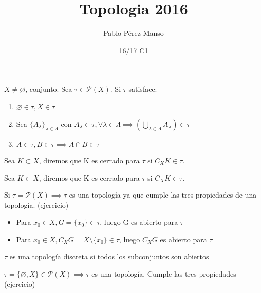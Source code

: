 \documentclass[palatino]{apuntes}
\title{Topologia 2016}
\author{Pablo Pérez Manso}
\date{16/17 C1}
\begin{document}
\pagestyle{plain}
\maketitle

\tableofcontents
\newpage

\begin{defn}[Topología]
$X \neq \varnothing$, conjunto. Sea $\tau \in \mathcal{P}(X)$. Si $\tau$ satisface:
\begin{enumerate}
\item $\varnothing \in \tau, X \in \tau$
\item Sea $\{A_\lambda\}_{\lambda \in \Lambda}$ con $ A_\lambda \in \tau, \forall \lambda \in \Lambda \implies  (\bigcup_{\lambda \in \Lambda} A_\lambda) \in \tau$
\item $A \in \tau, B \in \tau \implies A \cap B \in \tau$
\end{enumerate}
\end{defn}



\begin{defn}[Abierto]
Sea $K \subset X$, diremos que K es cerrado para $\tau$ si $C_XK\in\tau$.
\end{defn}
\begin{defn}[Cerrado]
Sea $K \subset X$, diremos que K es cerrado para $\tau$ si $C_XK\in\tau$.
\end{defn}

\begin{example}
	Si $\tau = \mathcal{P}(X) \implies \tau $ es una topología ya que cumple las tres propiedades de una topología. (ejercicio)

	\begin{itemize}
		\item Para $x_0 \in X, G=\{x_0\} \in \tau$, luego G es abierto para $\tau$
		\item Para $x_0 \in X, C_XG=X\setminus\{x_0\} \in \tau$, luego $C_XG$ es abierto para $\tau$
	\end{itemize}
\end{example}

\begin{defn}
$\tau$ es una topología discreta si todos los subconjuntos son abiertos
\end{defn}


\begin{example}
$\tau = \{\varnothing, X\} \in \mathcal{P}(X) \implies \tau$ es una topología. Cumple las tres propiedades (ejercicio)
\end{example}
\end{document}
